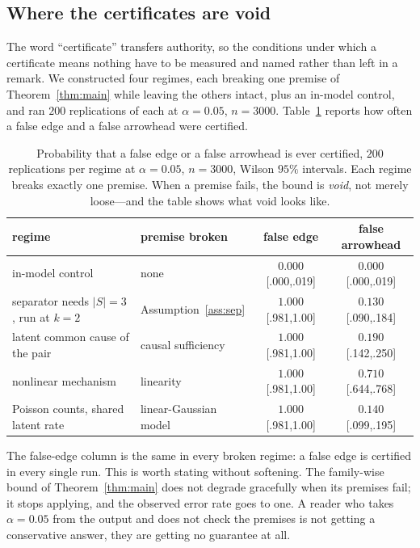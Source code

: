 
\subsection{Where the certificates are void}\label{sec:exp-violations}

The word ``certificate'' transfers authority, so the conditions under which a
certificate means nothing have to be measured and named rather than left in a
remark. We constructed four regimes, each breaking one premise of
Theorem~\ref{thm:main} while leaving the others intact, plus an in-model
control, and ran $200$ replications of each at $\alpha = 0.05$, $n = 3000$.
Table~\ref{tab:violations} reports how often a false edge and a false
arrowhead were certified.

\begin{table}[t]
\centering
\caption{Probability that a false edge or a false arrowhead is ever certified,
$200$ replications per regime at $\alpha = 0.05$, $n = 3000$, Wilson $95\%$
intervals. Each regime breaks exactly one premise. When a premise fails, the
bound is \emph{void}, not merely loose---and the table shows what void looks
like.}\label{tab:violations}
\footnotesize
\begin{tabular}{@{}llcc@{}}
\toprule
regime & premise broken & false edge & false arrowhead \\
\midrule
in-model control & none
  & $0.000$ \tiny{[.000,.019]} & $0.000$ \tiny{[.000,.019]} \\
separator needs $|S|=3$, run at $k=2$ & Assumption~\ref{ass:sep}
  & $1.000$ \tiny{[.981,1.00]} & $0.130$ \tiny{[.090,.184]} \\
latent common cause of the pair & causal sufficiency
  & $1.000$ \tiny{[.981,1.00]} & $0.190$ \tiny{[.142,.250]} \\
nonlinear mechanism & linearity
  & $1.000$ \tiny{[.981,1.00]} & $0.710$ \tiny{[.644,.768]} \\
Poisson counts, shared latent rate & linear-Gaussian model
  & $1.000$ \tiny{[.981,1.00]} & $0.140$ \tiny{[.099,.195]} \\
\bottomrule
\end{tabular}
\end{table}

The false-edge column is the same in every broken regime: a false edge is
certified in every single run. This is worth stating without softening. The
family-wise bound of Theorem~\ref{thm:main} does not degrade gracefully when
its premises fail; it stops applying, and the observed error rate goes to one.
A reader who takes $\alpha = 0.05$ from the output and does not check the
premises is not getting a conservative answer, they are getting no guarantee
at all.

